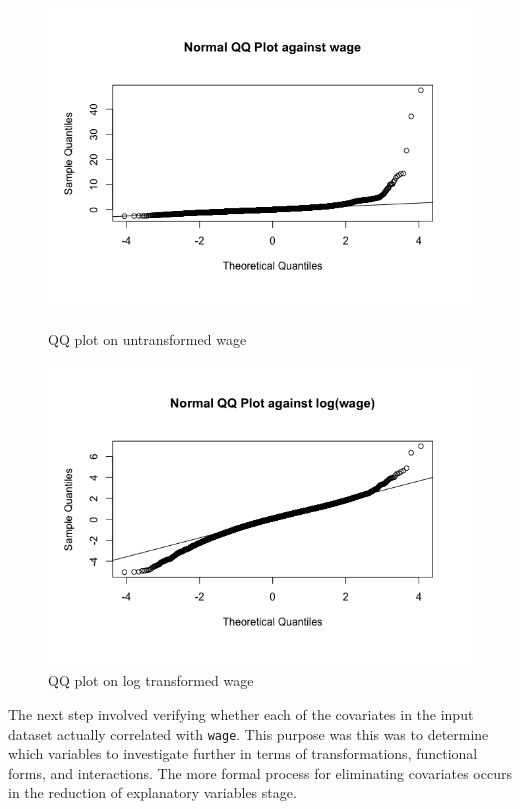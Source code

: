 \documentclass{article}
\begin{document}
      \begin{figure}
        \centering
        \begin{minipage}{.45\textwidth}
          \centering
          \includegraphics[scale=0.35]{transformation/qqwage}
          \caption{QQ plot on untransformed wage}
          \label{fig:qqwage}
        \end{minipage}
        \begin{minipage}{.45\textwidth}
          \centering
          \includegraphics[scale=0.35]{transformation/qqlogwage}
          \caption{QQ plot on log transformed wage}
          \label{fig:qqlogwage}
        \end{minipage}
      \end{figure}

      The next step involved verifying whether each of the covariates in the input dataset
      actually correlated with \texttt{wage}. This purpose was this was to determine
      which variables to investigate further in terms of transformations, functional forms,
      and interactions. The more formal process for eliminating covariates occurs in the
      reduction of explanatory variables stage.
\end{document}
